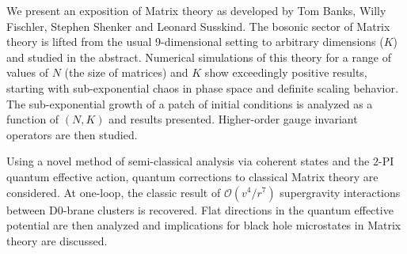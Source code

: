 We present an exposition of Matrix theory as developed by Tom Banks, Willy Fischler, Stephen 
Shenker and Leonard Susskind. The bosonic sector of Matrix theory is lifted from the usual 
9-dimensional setting to arbitrary dimensions ($K$) and studied in the abstract. Numerical 
simulations of this theory for a range of values of $N$ (the size of matrices) and $K$ show
exceedingly positive results, starting with sub-exponential chaos in phase space and definite 
scaling behavior. The sub-exponential growth of a patch of initial conditions is analyzed as a function of $(N, K)$ and results presented. Higher-order gauge invariant operators are then studied.

Using a novel method of semi-classical analysis via coherent states and the $2$-PI quantum effective action, quantum corrections to classical Matrix theory are considered. At one-loop, the classic result of $\mathcal{O}(v^4/r^7)$ supergravity interactions between D0-brane clusters is recovered. Flat directions in the quantum effective potential are then analyzed and implications for black hole microstates in Matrix theory are discussed.